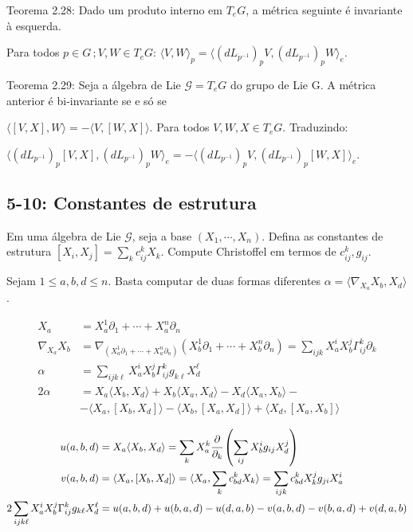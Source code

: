\documentclass[12pt]{article}
\begin{document}
		Teorema 2.28: Dado um produto interno em $T_eG$, a m\'etrica seguinte \'e invariante \`a esquerda.

		Para todos $p \in G\,; V, W \in T_eG$: $\langle V, W \rangle_p = \langle (dL_{p^{-1}})_p V, (dL_{p^{-1}})_p W \rangle_e$.

		Teorema 2.29: Seja a \'algebra de Lie $\mathcal{G} = T_eG$ do grupo de Lie G. A m\'etrica anterior \'e bi-invariante se e s\'o se

		$\langle [V, X], W \rangle = - \langle V, [W, X] \rangle$. Para todos $V, W, X \in T_eG$. Traduzindo:

		$\langle (dL_{p^{-1}})_p [V,X], (dL_{p^{-1}})_p W \rangle_e = - \langle (dL_{p^{-1}})_p V, (dL_{p^{-1}})_p [W,X] \rangle_e$.

		\subsection{5-10: Constantes de estrutura}
		\begin{flushright}
		\end{flushright}

		Em uma \'algebra de Lie $\mathcal{G}$, seja a base $(X_1, \cdots, X_n)$. Defina as constantes de estrutura $[X_i, X_j] = \sum_k c_{ij}^k X_k$. Compute Christoffel em termos de $c_{ij}^k, g_{ij}$.

		\vspace{3mm}

		Sejam $1 \le a,b,d \le n$. Basta computar de duas formas diferentes $\alpha = \langle \nabla_{X_a} X_b, X_d \rangle$.

		\begin{align}
		X_a &= X_a^1 \partial_1 + \cdots + X_a^n \partial_n \\
		\nabla_{X_a} X_b &= \nabla_{(X_a^1 \partial_1 + \cdots + X_a^n \partial_n)} (X_b^1 \partial_1 + \cdots + X_b^n \partial_n) = \sum_{ijk} X_a^i X_b^j \Gamma_{ij}^k \partial_k \\
		\alpha &= \sum_{ijk\ell} X_a^i X_b^j \Gamma_{ij}^k g_{k\ell} X_d^\ell \\
		2 \alpha &= X_a\langle X_b,X_d\rangle + X_b\langle X_a,X_d\rangle - X_d\langle X_a,X_b\rangle -\\
		&- \langle X_a, [X_b,X_d]\rangle - \langle X_b, [X_a,X_d]\rangle + \langle X_d, [X_a,X_b]\rangle
		\end{align}

		\begin{align}
		u(a, b, d) &= X_a\langle X_b,X_d\rangle = \sum_k X_a^k \cfrac{\partial}{\partial_k} \left( \sum_{ij} X_b^i g_{ij} X_d^j \right) \\
		v(a,b,d) &= \langle X_a, [X_b,X_d]\rangle = \langle X_a, \sum_k c_{bd}^k X_k\rangle = \sum_{ijk} c_{bd}^k X_k^j g_{ji} X_a^i \\
		2 \sum_{ijk\ell} X_a^i X_b^j \Gamma_{ij}^k g_{k\ell} X_d^\ell &= u(a,b,d) + u(b,a,d) - u(d,a,b) - v(a,b,d) - v(b,a,d) + v(d,a,b)
		\end{align}
\end{document}
